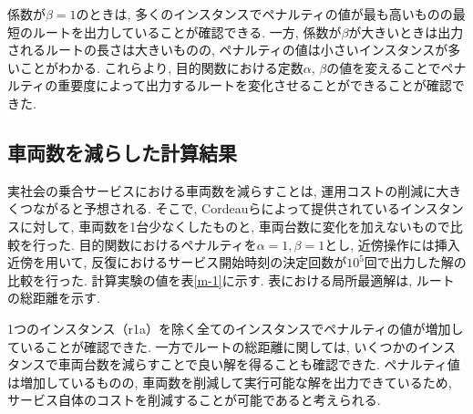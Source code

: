 係数が$\beta=1$のときは, 多くのインスタンスでペナルティの値が最も高いものの最短のルートを出力していることが確認できる. 一方, 係数が$\beta$が大きいときは出力されるルートの長さは大きいものの, ペナルティの値は小さいインスタンスが多いことがわかる.
これらより, 目的関数における定数$\alpha$, $\beta$の値を変えることでペナルティの重要度によって出力するルートを変化させることができることが確認できた.

\subsection{車両数を減らした計算結果}
実社会の乗合サービスにおける車両数を減らすことは, 運用コストの削減に大きくつながると予想される. そこで, Cordeauらによって提供されているインスタンスに対して, 車両数を1台少なくしたものと, 車両台数に変化を加えないもので比較を行った. 目的関数におけるペナルティを$\alpha=1, \beta=1$とし, 近傍操作には挿入近傍を用いて, 反復におけるサービス開始時刻の決定回数が$10^5$回で出力した解の比較を行った. 計算実験の値を表\ref{m-1}に示す. 表における局所最適解は, ルートの総距離を示す.

1つのインスタンス（r1a）を除く全てのインスタンスでペナルティの値が増加していることが確認できた. 一方でルートの総距離に関しては, いくつかのインスタンスで車両台数を減らすことで良い解を得ることも確認できた. ペナルティ値は増加しているものの, 車両数を削減して実行可能な解を出力できているため, サービス自体のコストを削減することが可能であると考えられる.

